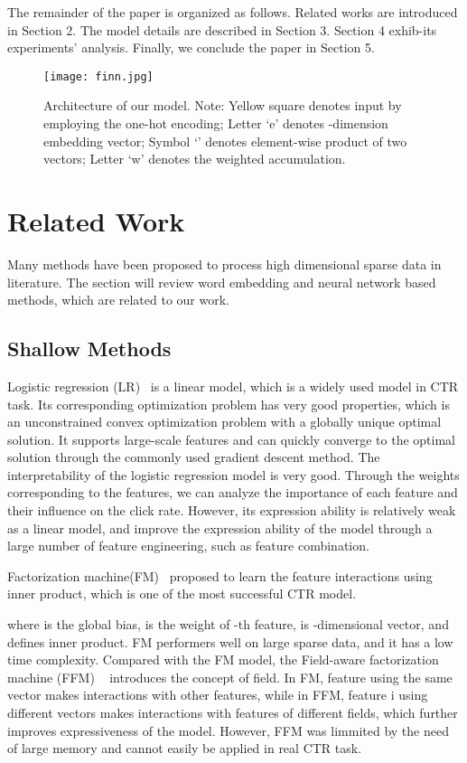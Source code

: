 \documentclass[journal]{IEEEtran}
\begin{document}
The remainder of the paper is organized as follows. Related works are introduced in Section 2. The model details are described in Section 3. Section 4 exhib-its experiments’ analysis. Finally, we conclude the paper in Section 5.

\begin{figure*}
\centerline{\texttt{[image: finn.jpg]}}
\caption{Architecture of our model. Note: Yellow square denotes input by employing the one-hot encoding; Letter `e' denotes -dimension embedding vector; Symbol `' denotes element-wise product of two vectors; Letter `w' denotes the weighted accumulation.
	}
	\label{fig_INN}       \end{figure*}

\section{Related Work}
Many methods have been proposed to process high dimensional sparse data in literature. The section will review word embedding and neural network based methods, which are related to our work.
\subsection{Shallow Methods}
Logistic regression (LR)~\cite{58} is a linear model, which is a widely used model in CTR task. Its corresponding optimization problem has very good properties, which is an unconstrained convex optimization problem with a globally unique optimal solution. It supports large-scale features and can quickly converge to the optimal solution through the commonly used gradient descent method. The interpretability of the logistic regression model is very good. Through the weights corresponding to the features, we can analyze the importance of each feature and their influence on the click rate. However, its expression ability is relatively weak as a linear model, and improve the expression ability of the model through a large number of feature engineering, such as feature combination.

Factorization machine(FM)~\cite{13} proposed to learn the feature interactions using inner product, which is one of the most successful CTR model.

where  is the global bias,  is the weight of -th feature,  is -dimensional vector, and  defines inner product. FM performers well on large sparse data, and it has a low time complexity. Compared with the FM model, the Field-aware factorization machine (FFM) ~\cite{14,15} introduces the concept of field. In FM, feature  using the same vector makes interactions with other features, while in FFM, feature i using different vectors makes interactions with features of different fields, which further improves expressiveness of the model. However, FFM was limmited by the need of large memory and cannot easily be applied in real CTR task.
\end{document}
